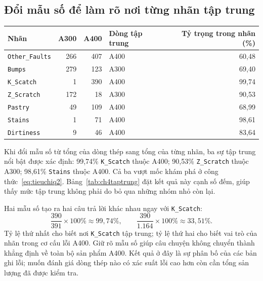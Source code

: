 \documentclass[12pt,a4paper,oneside]{report}
\newcommand{\maCot}[1]{{\urlstyle{tt}\def\UrlBreaks{\do\_\do\/\do\.}\def\UrlBigBreaks{}\nolinkurl{#1}}}
\begin{document}
\subsection{Đổi mẫu số để làm rõ nơi từng nhãn tập trung}

\begin{center}\begin{minipage}{\linewidth}
\label{tab:ch4taptrung}
\small{}
\begin{tabularx}{\linewidth}{@{}Y rr p{2.0cm}r@{}}
\toprule
Nhãn & A300 & A400 & Dòng tập trung & Tỷ trọng trong nhãn (\%) \\
\midrule
\maCot{Other_Faults} & 266 & 407 & A400 & 60,48 \\
\maCot{Bumps} & 279 & 123 & A300 & 69,40 \\
\maCot{K_Scatch} & 1 & 390 & A400 & 99,74 \\
\maCot{Z_Scratch} & 172 & 18 & A300 & 90,53 \\
\maCot{Pastry} & 49 & 109 & A400 & 68,99 \\
\maCot{Stains} & 1 & 71 & A400 & 98,61 \\
\maCot{Dirtiness} & 9 & 46 & A400 & 83,64 \\
\bottomrule
\end{tabularx}
\end{minipage}\end{center}

Khi đổi mẫu số từ tổng của dòng thép sang tổng của từng nhãn, ba sự tập trung nổi bật được xác định: 99,74\% \maCot{K_Scatch} thuộc A400; 90,53\% \maCot{Z_Scratch} thuộc A300; 98,61\% \maCot{Stains} thuộc A400. Cả ba vượt mốc khám phá ở công thức~\ref{eq:tieuchiq2}. Bảng~\ref{tab:ch4taptrung} đặt kết quả này cạnh số đếm, giúp thấy mức tập trung không phải do bỏ qua những nhóm nhỏ còn lại.

Hai mẫu số tạo ra hai câu trả lời khác nhau ngay với \maCot{K_Scatch}:
\begin{equation}
\frac{390}{391}\times100\%\approx99{,}74\%,
\qquad
\frac{390}{1.164}\times100\%\approx33{,}51\%.
\label{eq:ch4mauso}
\end{equation}
Tỷ lệ thứ nhất cho biết nơi \maCot{K_Scatch} tập trung; tỷ lệ thứ hai cho biết vai trò của nhãn trong cơ cấu lỗi A400. Giữ rõ mẫu số giúp câu chuyện không chuyển thành khẳng định về toàn bộ sản phẩm A400. Kết quả ở đây là sự phân bố của các bản ghi lỗi; muốn đánh giá dòng thép nào có xác suất lỗi cao hơn còn cần tổng sản lượng đã được kiểm tra.
\end{document}
